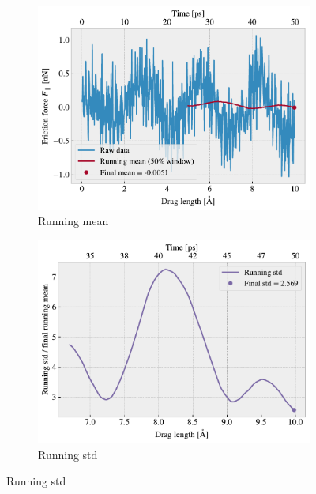 \begin{figure}[H]
  \centering
  \begin{subfigure}[b]{0.49\textwidth}
    \centering
    \includegraphics[width=\textwidth]{figures/baseline/Ff_runmean.pdf}
    \caption{Running mean}
    \label{fig:runmean}
  \end{subfigure}
  \hfill
  \begin{subfigure}[b]{0.49\textwidth}
      \centering
      \includegraphics[width=\textwidth]{figures/baseline/Ff_runstd.pdf}
      \caption{Running std}
      \label{fig:runstd}
  \end{subfigure}
  \caption{Running std}
  \label{fig:running}
\end{figure}


